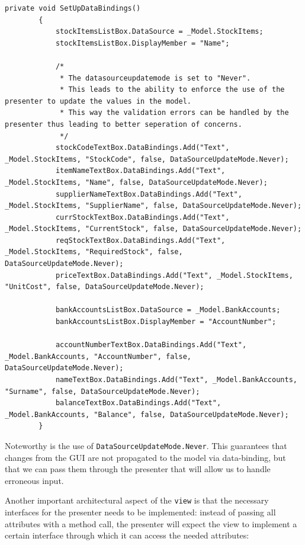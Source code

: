 \begin{lstlisting}[caption=Data Binding of \texttt{view} and \texttt{model}]
private void SetUpDataBindings()
        {
            stockItemsListBox.DataSource = _Model.StockItems;
            stockItemsListBox.DisplayMember = "Name";

            /*
             * The datasourceupdatemode is set to "Never".
             * This leads to the ability to enforce the use of the presenter to update the values in the model.
             * This way the validation errors can be handled by the presenter thus leading to better seperation of concerns.
             */
            stockCodeTextBox.DataBindings.Add("Text", _Model.StockItems, "StockCode", false, DataSourceUpdateMode.Never);
            itemNameTextBox.DataBindings.Add("Text", _Model.StockItems, "Name", false, DataSourceUpdateMode.Never);
            supplierNameTextBox.DataBindings.Add("Text", _Model.StockItems, "SupplierName", false, DataSourceUpdateMode.Never);
            currStockTextBox.DataBindings.Add("Text", _Model.StockItems, "CurrentStock", false, DataSourceUpdateMode.Never);
            reqStockTextBox.DataBindings.Add("Text", _Model.StockItems, "RequiredStock", false, DataSourceUpdateMode.Never);
            priceTextBox.DataBindings.Add("Text", _Model.StockItems, "UnitCost", false, DataSourceUpdateMode.Never);

            bankAccountsListBox.DataSource = _Model.BankAccounts;
            bankAccountsListBox.DisplayMember = "AccountNumber";

            accountNumberTextBox.DataBindings.Add("Text", _Model.BankAccounts, "AccountNumber", false, DataSourceUpdateMode.Never);
            nameTextBox.DataBindings.Add("Text", _Model.BankAccounts, "Surname", false, DataSourceUpdateMode.Never);
            balanceTextBox.DataBindings.Add("Text", _Model.BankAccounts, "Balance", false, DataSourceUpdateMode.Never);
        }
\end{lstlisting}

Noteworthy is the use of \texttt{DataSourceUpdateMode.Never}. This guarantees that changes from the \ac{GUI} are not propagated to the model via data-binding, but that we can pass them through the presenter that will allow us to handle erroneous input.

Another important architectural aspect of the \texttt{view} is that the necessary interfaces for the presenter needs to be implemented: instead of passing all attributes with a method call, the presenter will expect the view to implement a certain interface through which it can access the needed attributes:

